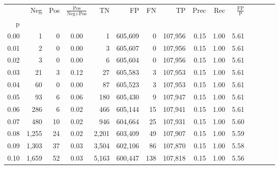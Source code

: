 \begin{tabular}{rrrcrrrrrrrrrrr}
\toprule
{} &     Neg &    Pos & $\frac{\text{Pos}}{\text{Neg}+\text{Pos}}$ &       TN &       FP &       FN &       TP &  Prec &   Rec & $\frac{\text{FP}}{\text{P}}$ \\
p    &         &        &                                            &          &          &          &          &       &       &                              \\
\midrule
0.00 &       1 &      0 &                                       0.00 &        1 &  605,609 &        0 &  107,956 &  0.15 &  1.00 &                         5.61 \\
0.01 &       2 &      0 &                                       0.00 &        3 &  605,607 &        0 &  107,956 &  0.15 &  1.00 &                         5.61 \\
0.02 &       3 &      0 &                                       0.00 &        6 &  605,604 &        0 &  107,956 &  0.15 &  1.00 &                         5.61 \\
0.03 &      21 &      3 &                                       0.12 &       27 &  605,583 &        3 &  107,953 &  0.15 &  1.00 &                         5.61 \\
0.04 &      60 &      0 &                                       0.00 &       87 &  605,523 &        3 &  107,953 &  0.15 &  1.00 &                         5.61 \\
0.05 &      93 &      6 &                                       0.06 &      180 &  605,430 &        9 &  107,947 &  0.15 &  1.00 &                         5.61 \\
0.06 &     286 &      6 &                                       0.02 &      466 &  605,144 &       15 &  107,941 &  0.15 &  1.00 &                         5.61 \\
0.07 &     480 &     10 &                                       0.02 &      946 &  604,664 &       25 &  107,931 &  0.15 &  1.00 &                         5.60 \\
0.08 &   1,255 &     24 &                                       0.02 &    2,201 &  603,409 &       49 &  107,907 &  0.15 &  1.00 &                         5.59 \\
0.09 &   1,303 &     37 &                                       0.03 &    3,504 &  602,106 &       86 &  107,870 &  0.15 &  1.00 &                         5.58 \\
0.10 &   1,659 &     52 &                                       0.03 &    5,163 &  600,447 &      138 &  107,818 &  0.15 &  1.00 &                         5.56 \\

\end{tabular}
